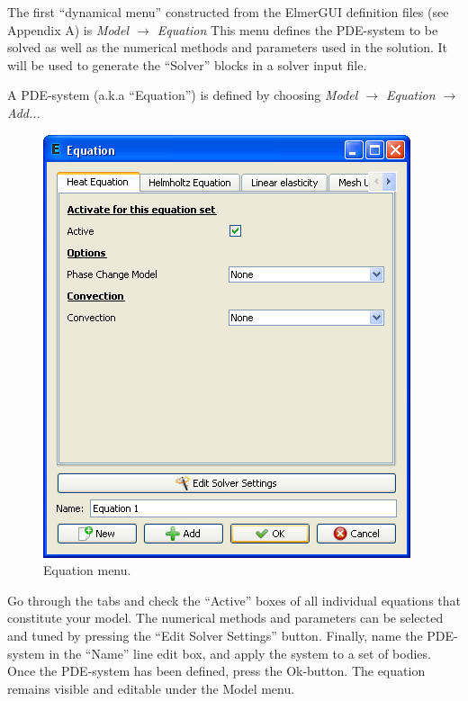 \documentclass[a4paper,12pt]{article}
\newcommand{\menu}[2]{{\it \vskip2mm #1 $\rightarrow$ #2 \vskip2mm}}
\newcommand{\dynmenu}[3]{{\it \vskip2mm #1 $\rightarrow$ #2 $\rightarrow$ #3 \vskip2mm}}
\begin{document}
The first ``dynamical menu'' constructed from the ElmerGUI definition files (see Appendix A) is
\menu{Model}{Equation}
\noindent This menu defines the PDE-system to be solved as well as the numerical
methods and parameters used in the solution. It will be used to generate the ``Solver''
blocks in a solver input file.

A PDE-system (a.k.a ``Equation'') is defined by choosing
\dynmenu{Model}{Equation}{Add...}

\begin{figure}[ht]
\begin{center}
 \includegraphics[scale=0.5]{images/equation.png}
\caption{Equation menu.}
\end{center}
\end{figure}

Go through the tabs and check the ``Active'' boxes of all individual equations that
constitute your model. The numerical methods and parameters can be
selected and tuned by pressing the ``Edit Solver Settings'' button. Finally, name the
PDE-system in the ``Name'' line edit box, and apply the system to a set of bodies.
Once the PDE-system has been defined, press the Ok-button. The equation remains
visible and editable under the Model menu.
\end{document}
